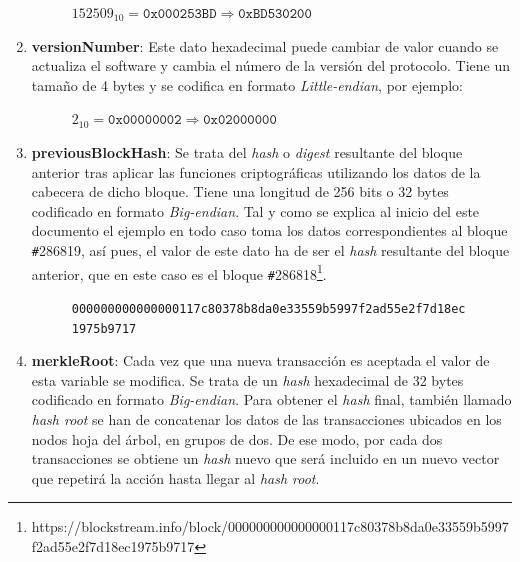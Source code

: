 \documentclass{article}
\begin{document}
\begin{enumerate}
        \begin{figure}[H]
        \centering
            $152509_{10} = \texttt{0x000253BD} \Rightarrow \texttt{0xBD530200}$
        \end{figure}
        
        \item \textbf{versionNumber}: Este dato hexadecimal puede cambiar de valor cuando se actualiza el software y cambia el número de la versión del protocolo. Tiene un tamaño de 4 bytes y se codifica en formato \textit{Little-endian}, por ejemplo:
        
        \begin{figure}[H]
        \centering
            $2_{10} = \texttt{0x00000002} \Rightarrow \texttt{0x02000000}$
        \end{figure}
        
        \item \textbf{previousBlockHash}: Se trata del \textit{hash} o \textit{digest} resultante del bloque anterior tras aplicar las funciones criptográficas utilizando los datos de la cabecera de dicho bloque. Tiene una longitud de 256 bits o 32 bytes codificado en formato \textit{Big-endian}. Tal y como se explica al inicio del este documento el ejemplo en todo caso toma los datos correspondientes al bloque \texttt{\#}286819, así pues, el valor de este dato ha de ser el \textit{hash} resultante del bloque anterior, que en este caso es el bloque \texttt{\#}286818\footnote{https://blockstream.info/block/000000000000000117c80378b8da0e33559b5997f2ad55e2f7d18ec1975b9717}.
        
        \begin{figure}[H]
        \centering
        \scriptsize{
            \texttt{000000000000000117c80378b8da0e33559b5997f2ad55e2f7d18ec1975b9717}
        }
        \end{figure}
        
        \item \textbf{merkleRoot}: Cada vez que una nueva transacción es aceptada el valor de esta variable se modifica. Se trata de un \textit{hash} hexadecimal de 32 bytes codificado en formato \textit{Big-endian}. Para obtener el \textit{hash} final, también llamado \textit{hash root} se han de concatenar los datos de las transacciones ubicados en los nodos hoja del árbol, en grupos de dos. De ese modo, por cada dos transacciones se obtiene un \textit{hash} nuevo que será incluido en un nuevo vector que repetirá la acción hasta llegar al \textit{hash root}.
        

\end{enumerate}
\end{document}
